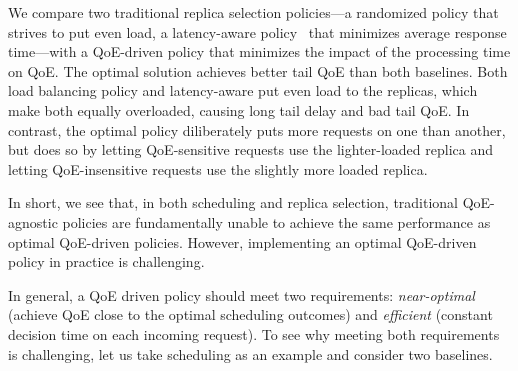 We compare two traditional replica selection policies---a randomized policy that strives to put even load, a latency-aware policy~\cite{suresh2015c3} that minimizes average response time---with a QoE-driven policy that minimizes the impact of the processing time on QoE.
The optimal solution achieves better tail QoE than both baselines. 
Both load balancing policy and latency-aware put even load to the replicas, which make both equally overloaded, causing long tail delay and bad tail QoE.
In contrast, the optimal policy diliberately puts more requests on one than another, but does so by letting QoE-sensitive requests use the lighter-loaded replica and letting QoE-insensitive requests use the slightly more loaded replica. 

In short, we see that, in both scheduling and replica selection, traditional QoE-agnostic policies are fundamentally unable to achieve the same performance as optimal QoE-driven policies. However, implementing an optimal  QoE-driven policy in practice is challenging.




In general, a QoE driven policy should meet two requirements: {\em near-optimal} (\ie achieve QoE close to the optimal scheduling outcomes) and {\em efficient} (\ie constant decision time on each incoming request).
To see why meeting both requirements is challenging, let us take scheduling as an example and consider two baselines.

